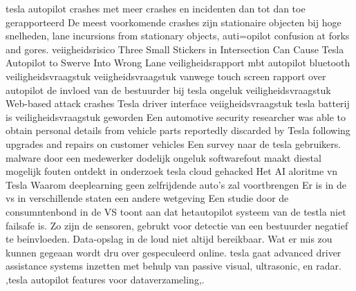 \cite{tiungteslasoftwarecrash}
tesla autopilot crashes met meer crashes en incidenten dan tot dan toe gerapporteerd
\cite{teslaFDSCrash}
De meest voorkomende crashes zijn stationaire objecten bij hoge snelheden, lane incursions from stationary objects, auti=opilot confusion at forks and gores.
\cite{teslaCrashesCauses}
\cite{teslacrashOvervieuw}
\cite{tesladeaths}
veiigheidsrisico Three Small Stickers in Intersection Can Cause Tesla Autopilot to Swerve Into Wrong Lane
\cite{evan01042019teslaautopilotIntersection}
veiligheidsrapport mbt autopilot
\cite{lambert31062020q2safetyreport}
bluetooth veiligheidsvraagstuk
\cite{wiredBloutoothHackTesla}
veiigheidsvraagstuk vanwege touch screen
\cite{preston14012021NHTSATeslaRecall}
rapport over autopilot
\cite{templeton06092019HTSBReportTesla}
de invloed van de bestuurder bij tesla ongeluk
veiligheidsvraagstuk
\cite{darkReading17112020TeslaBackup}
Web-based attack crashes Tesla driver interface
\cite{leyden23032020TeslaInterfaceHack}
veiigheidsvraagstuk
\cite{heilweil26022020teslaAutopilot}
tesla batterij is veiligheidsvraagstuk geworden
\cite{mitchell01072020teslabatterycooling}
Een automotive security researcher was able to obtain personal details from vehicle parts reportedly discarded by Tesla following upgrades and repairs on customer vehicles
\cite{stumpff04052020TeslaPersonalData}
Een survey naar de tesla gebruikers.
\cite{randall05112019modelSurvey}
malware door een medewerker
dodelijk ongeluk
\cite{fottrell03092018TeslaSecurityChecks}
softwarefout maakt diestal mogelijk
\cite{kirk26112020modelX}
fouten ontdekt in onderzoek
\cite{bbc24022021hyundaiBatteryFireFix}
tesla cloud gehacked
\cite{hawkins22102022}
Het AI aloritme vn Tesla
\cite{rangaiah25022020teslaAI}
Waarom deeplearning geen zelfrijdende auto's zal voortbrengen
\cite{bdickson29072020teslalevelfive}
Er is in de vs in verschillende staten een andere wetgeving
\cite{berry21042021teslacrashtexas}
\cite{hull23072021regulatorsaftercrash}
\cite{wikiTeslaAutopilot}
Een studie door de consumntenbond in de VS toont aan dat hetautopilot systeem van de testla niet failsafe is. Zo zijn de sensoren, gebrukt voor detectie van een bestuurder negatief te beinvloeden.
\cite{dowling23042021autopilottricking}
Data-opslag in de loud niet altijd bereikbaar.
\cite{mitchell24022020AIDataTesla}
Wat er mis zou kunnen gegeaan wordt dru over gespeculeerd online.
\cite{stackexchange102019teslacarmistake}
tesla gaat advanced driver assistance systems inzetten met behulp van  passive visual, ultrasonic, en radar.
\cite{tasking07062017TeslaAugmentedSafety},\cite{ackerman01072016TeslaImperfect}tesla autopilot features voor dataverzameling\cite{denneyjdsupraFeds},\cite{gritti24062020tesladataengine}.
